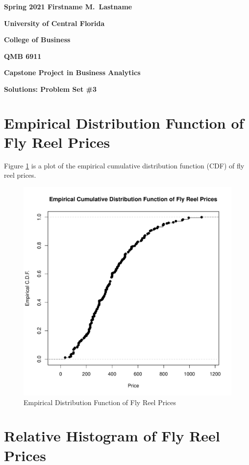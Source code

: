 \documentclass[11pt]{book}
\begin{document}

\pagestyle{empty}
{\noindent\bf Spring 2021 \hfill Firstname M.~Lastname}
\vskip 16pt
\centerline{\bf University of Central Florida}
\centerline{\bf College of Business}
\vskip 16pt
\centerline{\bf QMB 6911}
\centerline{\bf Capstone Project in Business Analytics}
\vskip 10pt
\centerline{\bf Solutions:  Problem Set \#3}
\vskip 32pt
\noindent



\section*{Empirical Distribution Function of Fly Reel Prices}

Figure \ref{fig:ecdf_prices} is 
a plot of the empirical cumulative distribution function (CDF) of fly reel prices. 


\begin{figure}[h!]
  \centering
  \includegraphics[scale = 0.5, keepaspectratio=true]{../Figures/ecdf_prices}
  \caption{Empirical Distribution Function of Fly Reel Prices} \label{fig:ecdf_prices}
\end{figure}


\section*{Relative Histogram of Fly Reel Prices}
\end{document}
